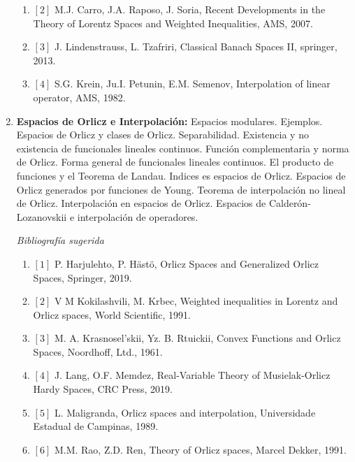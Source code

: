 \documentclass[10pt,a4paper]{article}
\begin{document}
\begin{enumerate}
\begin{enumerate}[]
\item $[2]$ M.J. Carro, J.A. Raposo, J. Soria, Recent Developments in the Theory of Lorentz Spaces and Weighted Inequalities, AMS, 2007.

\item $[3]$ J. Lindenstrauss, L. Tzafriri, Classical Banach Spaces II, springer, 2013.

\item $[4]$ S.G. Krein, Ju.I. Petunin, E.M. Semenov, Interpolation of linear operator, AMS, 1982.

\end{enumerate}

\item\textbf{Espacios de Orlicz e Interpolación:} Espacios modulares. Ejemplos. Espacios de Orlicz y clases de Orlicz. Separabilidad. Existencia y no existencia de funcionales lineales continuos. Función complementaria y norma de Orlicz. Forma general de funcionales lineales continuos. El producto de funciones y el Teorema de Landau. Indices es espacios de Orlicz. Espacios de Orlicz generados por funciones de Young. Teorema de interpolación no lineal de Orlicz. Interpolación en espacios de Orlicz. Espacios de Calderón-Lozanovskii e interpolación de operadores.

\noindent \textit{Bibliografía sugerida}

\begin{enumerate}[]

\item $[1]$  P. Harjulehto, P. Hästö, Orlicz Spaces and Generalized Orlicz Spaces, Springer, 2019.

\item $[2]$ V M Kokilashvili, M. Krbec, Weighted inequalities in Lorentz and Orlicz spaces, World Scientific, 1991.

\item $[3]$ M. A. Krasnosel'skii, Yz. B. Rtuickii, Convex Functions and Orlicz Spaces, Noordhoff, Ltd., 1961.

\item $[4]$ J. Lang, O.F. Memdez, Real-Variable Theory of Musielak-Orlicz Hardy Spaces, CRC Press, 2019.

\item $[5]$ L. Maligranda, Orlicz spaces and interpolation,  Universidade Estadual de Campinas, 1989.

\item $[6]$ M.M. Rao, Z.D. Ren, Theory of Orlicz spaces, Marcel Dekker, 1991.

\end{enumerate}


\end{enumerate}
\end{document}
